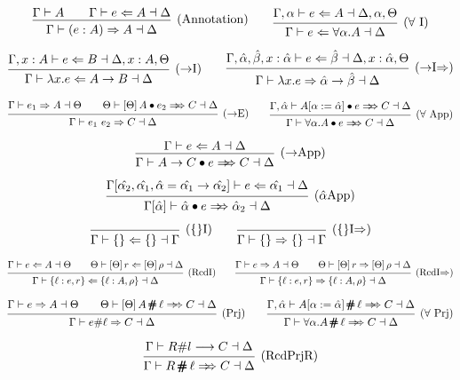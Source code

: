 \documentclass{article}
\renewcommand{\implies}{\Rightarrow}
\newcommand{\synthesizes}{\Rightarrow \!\!\! \Rightarrow}
\newcommand{\app}{\bullet}
\newcommand{\prj}{\,\pmb{\#}\,}
\newcommand{\ev}{\hat}
\newcommand{\spc}{\qquad}
\newcommand{\apply}[1]{\left[#1\right]}
\newcommand{\synth}[4]{#1 \vdash #2 \Rightarrow #3 \dashv #4}
\renewcommand{\check}[4]{#1 \vdash #2 \Leftarrow #3 \dashv #4}
\newcommand{\presynth}[6]{#1 \vdash #2 #3 #4 \synthesizes #5 \dashv #6}
\newcommand{\lookup}[5]{#1 \vdash #2 \# #3 \longrightarrow #4 \dashv #5}
\newcommand{\deduct}[3][]
{
  \begin{prooftree}
    \hypo{#2}
    \infer1[\text{#1}]{#3}
  \end{prooftree}
}
\begin{document}
\[
  \deduct[(Annotation)]
  { \Gamma \vdash A \spc \check{\Gamma}{e}{A}{\Delta} }
  { \synth{\Gamma}{(e : A)}{A}{\Delta} }
  \spc
  \deduct[(\(\forall\) I)]
  { \check{\Gamma, \alpha}{e}{A}{\Delta, \alpha, \Theta} }
  { \check{\Gamma}{e}{\forall \alpha. A}{\Delta} }
\]

\[
  \deduct[(\(\to\)I)]
  { \check{\Gamma, x : A}{e}{B}{\Delta, x : A, \Theta} }
  { \check{\Gamma}{\lambda x. e}{A \to B}{\Delta} }
  \spc
  \deduct[(\(\to\)I\(\implies\))]
  { \check{\Gamma, \ev\alpha, \ev\beta, x : \ev\alpha}{e}{\ev\beta}{\Delta, x : \ev\alpha, \Theta} }
  { \synth{\Gamma}{\lambda x. e}{\ev\alpha \to \ev\beta}{\Delta} }
\]

\[
  \deduct[(\(\to\)E)]
  { \synth{\Gamma}{e_1}{A}{\Theta} \spc \presynth{\Theta}{\apply\Theta A}{\app}{e_2}{C}{\Delta} }
  { \synth{\Gamma}{e_1 \ e_2}{C}{\Delta}  }
  \spc
  \deduct[(\(\forall\) App)]
  { \presynth{\Gamma, \ev\alpha}{A[\alpha := \ev\alpha]}{\app}{e}{C}{\Delta} }
  { \presynth{\Gamma}{\forall \alpha. A}{\app}{e}{C}{\Delta} }
\]

\[
  \deduct[(\(\to\)App)]
    { \check{\Gamma}{e}{A}{\Delta} }
    { \presynth{\Gamma}{A \to C}{\app}{e}{C}{\Delta} }
\]

\[
  \deduct[(\(\ev\alpha\)App)]
    {
      \check{\Gamma[\ev{\alpha_2}, \ev{\alpha_1}, \ev \alpha = \ev{\alpha_1} \to
        \ev{\alpha_2}]}{e}{\ev{\alpha_1}}{\Delta}
    }
    { \presynth{\Gamma[\ev\alpha]}{\ev\alpha}{\app}{e}{\ev\alpha_2}{\Delta} }
\]


\[
\deduct[(\{\}I)]{}{\check{\Gamma}{\{\}}{\{\}}{\Gamma}}
\spc
\deduct[(\{\}I\(\implies\))]{}{\synth{\Gamma}{\{\}}{\{\}}{\Gamma}}
\]

\[
  \deduct[(RcdI)]
  { \check{\Gamma}{e}{A}{\Theta} \spc \check{\Theta}{\apply\Theta r}{\apply\Theta\rho}{\Delta} }
  { \check{\Gamma}{\{\ell : e , r \}}{\{\ell : A, \rho\}}{\Delta} }
  \spc
  \deduct[(RcdI\(\implies\))]
  { \synth{\Gamma}{e}{A}{\Theta} \spc \synth{\Theta}{\apply\Theta r}{\apply\Theta \rho}{\Delta} }
  { \synth{\Gamma}{\{\ell : e , r \}}{\{\ell : A, \rho\}}{\Delta} }
\]

\[
  \deduct[(Prj)]
  { \synth{\Gamma}{e}{A}{\Theta} \spc
    \presynth{\Theta}{\apply\Theta A}{\prj}{\ell}{C}{\Delta}
  }
  { \synth{\Gamma}{e\#\ell}{C}{\Delta} }
  \spc
  \deduct[(\(\forall\) Prj)]
  { \presynth{\Gamma, \ev\alpha}{A[\alpha := \ev\alpha]}{\prj}{\ell}{C}{\Delta} }
  { \presynth{\Gamma}{\forall \alpha. A}{\prj}{\ell}{C}{\Delta} }
\]

\[
  \deduct[(RcdPrjR)]
    { \lookup{\Gamma}{R}{l}{C}{\Delta} }
    { \presynth{\Gamma}{R}{\prj}{\ell}{C}{\Delta} }
\]
\end{document}
